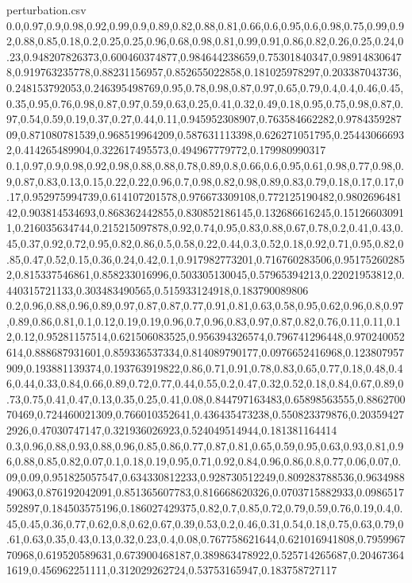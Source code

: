 \documentclass{llncs}
\begin{document}
\begin{filecontents*}{perturbation.csv}
0.0,0.97,0.9,0.98,0.92,0.99,0.9,0.89,0.82,0.88,0.81,0.66,0.6,0.95,0.6,0.98,0.75,0.99,0.92,0.88,0.85,0.18,0.2,0.25,0.25,0.96,0.68,0.98,0.81,0.99,0.91,0.86,0.82,0.26,0.25,0.24,0.23,0.948207826373,0.600460374877,0.984644238659,0.75301840347,0.989148306478,0.919763235778,0.88231156957,0.852655022858,0.181025978297,0.203387043736,0.248153792053,0.246395498769,0.95,0.78,0.98,0.87,0.97,0.65,0.79,0.4,0.4,0.46,0.45,0.35,0.95,0.76,0.98,0.87,0.97,0.59,0.63,0.25,0.41,0.32,0.49,0.18,0.95,0.75,0.98,0.87,0.97,0.54,0.59,0.19,0.37,0.27,0.44,0.11,0.945952308907,0.763584662282,0.978435928709,0.871080781539,0.968519964209,0.587631113398,0.626271051795,0.254430666932,0.414265489904,0.322617495573,0.494967779772,0.179980990317
0.1,0.97,0.9,0.98,0.92,0.98,0.88,0.88,0.78,0.89,0.8,0.66,0.6,0.95,0.61,0.98,0.77,0.98,0.9,0.87,0.83,0.13,0.15,0.22,0.22,0.96,0.7,0.98,0.82,0.98,0.89,0.83,0.79,0.18,0.17,0.17,0.17,0.952975994739,0.614107201578,0.976673309108,0.772125190482,0.980269648142,0.903814534693,0.868362442855,0.830852186145,0.132686616245,0.151266030911,0.216035634744,0.215215097878,0.92,0.74,0.95,0.83,0.88,0.67,0.78,0.2,0.41,0.43,0.45,0.37,0.92,0.72,0.95,0.82,0.86,0.5,0.58,0.22,0.44,0.3,0.52,0.18,0.92,0.71,0.95,0.82,0.85,0.47,0.52,0.15,0.36,0.24,0.42,0.1,0.917982773201,0.716760283506,0.951752602852,0.815337546861,0.858233016996,0.503305130045,0.57965394213,0.22021953812,0.440315721133,0.303483490565,0.515933124918,0.183790089806
0.2,0.96,0.88,0.96,0.89,0.97,0.87,0.87,0.77,0.91,0.81,0.63,0.58,0.95,0.62,0.96,0.8,0.97,0.89,0.86,0.81,0.1,0.12,0.19,0.19,0.96,0.7,0.96,0.83,0.97,0.87,0.82,0.76,0.11,0.11,0.12,0.12,0.95281157514,0.621506083525,0.956394326574,0.796741296448,0.970240052614,0.888687931601,0.859336537334,0.814089790177,0.0976652416968,0.123807957909,0.193881139374,0.193763919822,0.86,0.71,0.91,0.78,0.83,0.65,0.77,0.18,0.48,0.46,0.44,0.33,0.84,0.66,0.89,0.72,0.77,0.44,0.55,0.2,0.47,0.32,0.52,0.18,0.84,0.67,0.89,0.73,0.75,0.41,0.47,0.13,0.35,0.25,0.41,0.08,0.844797163483,0.65898563555,0.886270070469,0.724460021309,0.766010352641,0.436435473238,0.550823379876,0.203594272926,0.47030747147,0.321936026923,0.524049514944,0.181381164414
0.3,0.96,0.88,0.93,0.88,0.96,0.85,0.86,0.77,0.87,0.81,0.65,0.59,0.95,0.63,0.93,0.81,0.96,0.88,0.85,0.82,0.07,0.1,0.18,0.19,0.95,0.71,0.92,0.84,0.96,0.86,0.8,0.77,0.06,0.07,0.09,0.09,0.951825057547,0.634330812233,0.928730512249,0.809283788536,0.963498849063,0.876192042091,0.851365607783,0.816668620326,0.0703715882933,0.0986517592897,0.184503575196,0.186027429375,0.82,0.7,0.85,0.72,0.79,0.59,0.76,0.19,0.4,0.45,0.45,0.36,0.77,0.62,0.8,0.62,0.67,0.39,0.53,0.2,0.46,0.31,0.54,0.18,0.75,0.63,0.79,0.61,0.63,0.35,0.43,0.13,0.32,0.23,0.4,0.08,0.767758621644,0.621016941808,0.795996770968,0.619520589631,0.673900468187,0.389863478922,0.525714265687,0.204673641619,0.456962251111,0.312029262724,0.53753165947,0.183758727117

\end{filecontents*}
\end{document}
